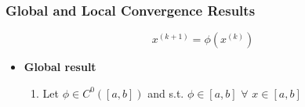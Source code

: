 \subsubsection{Global and Local Convergence Results}
$$x^{(k+1)}=\phi(x^{(k)})$$
\begin{itemize}
    \item \textbf{Global result}
    \begin{enumerate}
        \item Let $\phi\in C^0([a,b])$ and s.t. $\phi\in[a,b]\,\,\forall\,\,x\in[a,b]$\\
        \begin{figure}[!ht]
            \begin{minipage}{\linewidth}
                \centering
            \end{minipage}
        \end{figure}
        

\end{enumerate}
\end{itemize}
